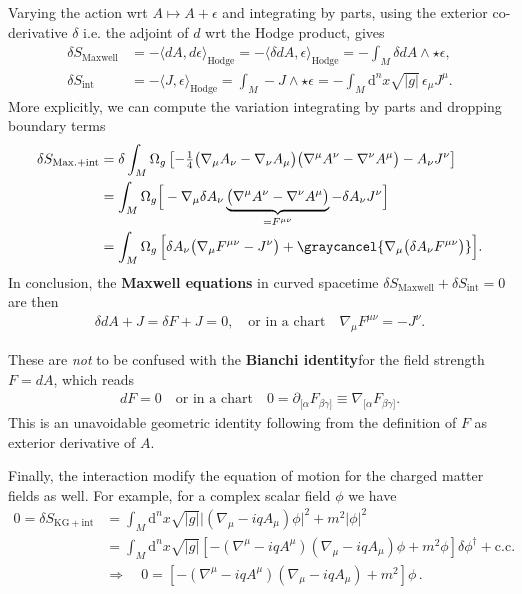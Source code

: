 \begin{mytheorem}
%
Varying the action wrt $A\mapsto A+\epsilon $ and integrating by parts, using the exterior co-derivative $\delta$ i.e. the adjoint of $d$ wrt the Hodge product, gives
\begin{align}
    \delta S_{\mathrm{Maxwell}} &= -\langle dA, d\epsilon \rangle_{\mathrm{Hodge}} = - \langle \delta dA, \epsilon \rangle_{\mathrm{Hodge}} = -\int_M \delta d A\wedge \star \epsilon,
    \\
    \delta S_{\mathrm{int}} &= -\langle J,\epsilon\rangle_{\mathrm{Hodge}}=\int_M - J \wedge \star \epsilon= -\int_M\!\!\mathrm{d}^n x\sqrt{|g|}\, \epsilon_\mu J^\mu.
\end{align}
%
More explicitly, we can compute the variation integrating by parts and dropping boundary terms
\begin{align}
    \delta S_{\mathrm{Max.}+\mathrm{int}} &= \delta \int_M \Omega_g \left[-\tfrac{1}{4} \big(\nabla_\mu A_\nu - \nabla_\nu A_\mu\big)\big(\nabla^\mu A^\nu - \nabla^\nu A^\mu\big)- A_\nu J^\nu\right]
    \\
    &= \int_M \Omega_g  \Big[-\nabla_\mu \delta A_\nu \underbrace{\big(\nabla^\mu A^\nu - \nabla^\nu A^\mu\big)}_{=F^{\mu\nu}} - \delta A_\nu J^\nu \Big]
    \\
    &= \int_M \Omega_g\, \Big[\delta A_\nu \big(\nabla_\mu F^{\mu\nu} - J^\nu \big) + \graycancel{\nabla_\mu\big(\delta A_\nu F^{\mu\nu}\big)}\Big].
\end{align}
In conclusion, the \textbf{Maxwell equations} in curved spacetime $\delta S_{\mathrm{Maxwell}} + \delta S_{\mathrm{int}}=0$ are then
\begin{align}
    \delta d A +J= \delta F +J= 0, \quad \text{or in a chart} \quad \nabla_\mu F^{\mu\nu} = -J^\nu.
\end{align}

These are \emph{not} to be confused with the \textbf{Bianchi identity} for the field strength $F=dA$, which reads
\begin{align}
    dF=0\quad \text{or in a chart} \quad  0=\partial_{[\alpha} F_{\beta\gamma]}\equiv \nabla_{[\alpha} F_{\beta\gamma]}.
\end{align}
This is an unavoidable geometric identity following from the definition of $F$ as exterior derivative of $A$.

Finally, the interaction modify the equation of motion for the charged matter fields as well.
For example, for a complex scalar field $\phi$ we have
\begin{align}
    0 = \delta S_{\mathrm{KG}+ \mathrm{int}} &= \int_M \mathrm{d}^n x \sqrt{|g|} \big|\left(\nabla_\mu -iq A_\mu\right)\phi\big|^2 + m^2 |\phi|^2
    \\
    &= \int_M \mathrm{d}^n x \sqrt{|g|} \left[ -\left(\nabla^\mu - i q A^\mu\right)\left(\nabla_\mu - i q A_\mu\right) \phi + m^2 \phi \right] \delta \phi^\dagger + \text{c.c.}
    \\
    &\Rightarrow \quad 0 = \left[ -\left(\nabla^\mu - i q A^\mu\right)\left(\nabla_\mu - i q A_\mu\right) + m^2 \right] \phi\, .
\end{align}
%
\end{mytheorem}
